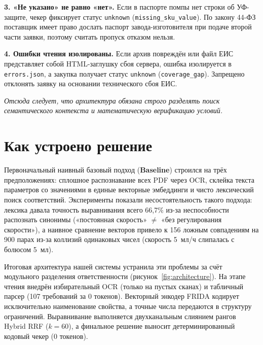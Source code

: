 \documentclass[10pt,a4paper]{article}
\begin{document}
\textbf{3. «Не указано» не равно «нет».} Если в паспорте помпы нет строки об УФ-защите, чекер фиксирует статус \texttt{unknown} (\texttt{missing\_sku\_value}). По закону 44-ФЗ поставщик имеет право дослать паспорт завода-изготовителя при подаче второй части заявки, поэтому считать пропуск отказом нельзя.

\textbf{4. Ошибки чтения изолированы.} Если архив повреждён или файл ЕИС представляет собой HTML-заглушку сбоя сервера, ошибка изолируется в \texttt{errors.json}, а закупка получает статус \texttt{unknown} (\texttt{coverage\_gap}). Запрещено отклонять заявку на основании технического сбоя ЕИС.

\emph{Отсюда следует, что архитектура обязана строго разделять поиск семантического контекста и математическую верификацию условий.}

\newpage
\section{Как устроено решение}

Первоначальный наивный базовый подход (\textbf{Baseline}) строился на трёх предположениях: сплошное распознавание всех PDF через OCR, склейка текста параметров со значениями в единые векторные эмбеддинги и чисто лексический поиск соответствий. Эксперименты показали несостоятельность такого подхода: лексика давала точность выравнивания всего 66,7\% из-за неспособности распознать синонимы («постоянная скорость» $\neq$ «без регулирования скорости»), а наивное сравнение векторов привело к 156 ложным совпадениям на 900 парах из-за коллизий одинаковых чисел (скорость 5~мл/ч слипалась с болюсом 5~мл).

Итоговая архитектура нашей системы устранила эти проблемы за счёт модульного разделения ответственности (рисунок~\ref{fig:architecture}). На этапе чтения внедрён избирательный OCR (только на пустых сканах) и табличный парсер (107 требований за 0 токенов). Векторный энкодер FRIDA кодирует исключительно наименование свойства, а точные числа передаются в структуру ограничений. Выравнивание выполняется двухканальным слиянием рангов Hybrid RRF ($k=60$), а финальное решение выносит детерминированный кодовый чекер (0 токенов).
\end{document}
